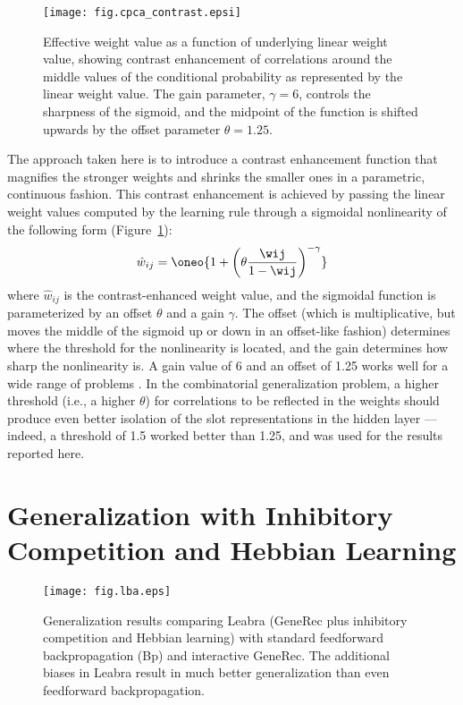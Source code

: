 \documentclass[12pt,twoside]{article}
\begin{document}
\begin{figure}
  \centering\texttt{[image: fig.cpca\_contrast.epsi]}
  \caption{\small Effective weight value as a function of underlying
    linear weight value, showing contrast enhancement of correlations
    around the middle values of the conditional probability as
    represented by the linear weight value.  The gain parameter,
    $\gamma=6$, controls the sharpness of the sigmoid, and the
    midpoint of the function is shifted upwards by the offset
    parameter $\theta=1.25$.}
  \label{fig.cpca_contrast}
\end{figure}

The approach taken here is to introduce a contrast enhancement
function that magnifies the stronger weights and shrinks the smaller
ones in a parametric, continuous fashion.  This contrast enhancement
is achieved by passing the linear weight values computed by the
learning rule through a sigmoidal nonlinearity of the following form
(Figure~\ref{fig.cpca_contrast}):
\begin{equation}
  \hat{w}_{ij} = \oneo{1 + \left(\theta \frac{\wij}{1-\wij}\right)^{-\gamma}}
  \label{eq.wt_off}
\end{equation}
where $\hat{w}_{ij}$ is the contrast-enhanced weight value, and the
sigmoidal function is parameterized by an offset $\theta$ and a gain
$\gamma$.  The offset (which is multiplicative, but moves the middle
of the sigmoid up or down in an offset-like fashion) determines where
the threshold for the nonlinearity is located, and the gain determines
how sharp the nonlinearity is.  A gain value of 6 and an offset of
1.25 works well for a wide range of problems \cite{OReillyMunakata00}.
In the combinatorial generalization problem, a higher threshold (i.e.,
a higher $\theta$) for correlations to be reflected in the weights
should produce even better isolation of the slot representations in
the hidden layer --- indeed, a threshold of 1.5 worked better than
1.25, and was used for the results reported here.

\section{Generalization with Inhibitory Competition and Hebbian Learning}

\begin{figure}
  \centering\texttt{[image: fig.lba.eps]}
  \caption{\small Generalization results comparing Leabra (GeneRec plus
    inhibitory competition and Hebbian learning) with standard
    feedforward backpropagation (Bp) and interactive GeneRec.  The
    additional biases in Leabra result in much better generalization
    than even feedforward backpropagation.}
  \label{fig.lba}
\end{figure}
\end{document}
